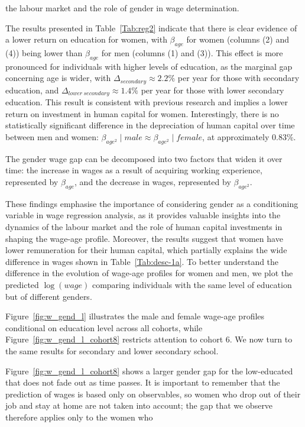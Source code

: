 \documentclass[12pt]{article}
\begin{document}
the labour market and the role of gender in wage determination.
\par
The results presented in Table~\ref{Tab:reg2} indicate that there is clear evidence of a lower return on education for
women, with $\beta_{age}$ for women (columns (2) and (4)) being lower than $\beta_{age}$ for men (columns (1) and (3)).
This effect is more pronounced for individuals with
higher levels of education, as the marginal gap concerning age is wider, with $\Delta_{secondary} \approx 2.2\%$
per year for those with secondary education, and $\Delta_{lower\ secondary} \approx 1.4\%$ per year for those with lower
secondary education. This result is consistent with previous research \citep{erosa2012human} and implies a lower return
on investment in human capital for women. Interestingly, there is no statistically significant difference in the
depreciation of human capital over time between men and women: $\beta_{age^2}\mid male \approx \beta_{age^2}\mid
female$, at approximately $0.83\%$.
\par
The gender wage gap can be decomposed into two factors that widen it over time: the increase in wages as a result of
acquiring working experience, represented by $\beta_{age}$, and the decrease in wages, represented by $\beta_{age^2}$.
\par
These findings emphasise the importance of considering gender as a conditioning variable in wage regression analysis, as
it provides valuable insights into the dynamics of the labour market and the role of human capital investments in shaping
the wage-age profile. Moreover, the results suggest that women have lower remuneration for their human capital, which
partially explains the wide difference in wages shown in Table~\ref{Tab:desc-1a}. To better understand the difference in
the evolution of wage-age profiles for women and men, we plot the predicted $\log(wage)$ comparing
individuals with the same level of education but of different genders.
\par
Figure~\ref{fig:w_gend_l} illustrates the male and female wage-age profiles conditional on education level across
all cohorts, while Figure~\ref{fig:w_gend_l_cohort8} restricts attention to cohort 6. We now turn to the same results for
secondary and lower secondary school.
\par
Figure~\ref{fig:w_gend_l_cohort8} shows a larger gender gap for the low-educated that does not fade out as time
passes. It is important to remember that the prediction of wages is based only on observables, so women who drop
out of their job and stay at home are not taken into account; the gap that we observe therefore applies only to the women who
\end{document}
